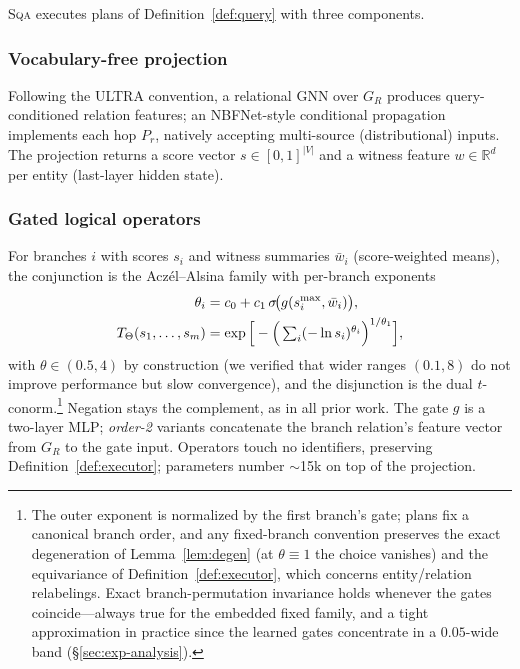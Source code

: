 \documentclass[journal]{IEEEtran}
\newcommand{\SQA}{\textsc{Sqa}}
\begin{document}
\SQA{} executes plans of Definition~\ref{def:query} with three components.

\subsubsection{Vocabulary-free projection} Following the ULTRA convention,
a relational GNN over $G_R$ produces query-conditioned relation features;
an NBFNet-style conditional propagation implements each hop $P_r$, natively
accepting multi-source (distributional) inputs. The projection returns a
score vector $s\in[0,1]^{|V|}$ and a witness feature
$w\in\mathbb R^{d}$ per entity (last-layer hidden state).

\subsubsection{Gated logical operators} For branches $i$ with scores
$s_i$ and witness summaries $\bar w_i$ (score-weighted means), the
conjunction is the Acz\'el--Alsina family with per-branch exponents
\begin{align}
\theta_i &= c_0 + c_1\,\sigma\!\big(g(s_i^{\max},\bar w_i)\big),\notag\\
T_\Theta(s_1,\dots,s_m) &= \exp\Big[-\Big(\textstyle\sum_i(-\ln s_i)^{\theta_i}\Big)^{1/\theta_1}\Big],
\end{align}
with $\theta\in(0.5,4)$ by construction (we verified that wider ranges
$(0.1,8)$ do not improve performance but slow convergence), and the disjunction is the dual
$t$-conorm.\footnote{The outer exponent is normalized by the first
branch's gate; plans fix a canonical branch order, and any fixed-branch
convention preserves the exact degeneration of Lemma~\ref{lem:degen}
(at $\theta\equiv1$ the choice vanishes) and the
equivariance of Definition~\ref{def:executor}, which concerns
entity/relation relabelings. Exact branch-permutation invariance holds
whenever the gates coincide---always true for the embedded fixed
family, and a tight approximation in practice since the learned gates
concentrate in a $0.05$-wide band (\S\ref{sec:exp-analysis}).} Negation stays the complement, as in all prior work. The gate
$g$ is a two-layer MLP; \emph{order-2} variants concatenate the branch
relation's feature vector from $G_R$ to the gate input. Operators touch no
identifiers, preserving Definition~\ref{def:executor}; parameters number
$\sim$15k on top of the projection.
\end{document}
